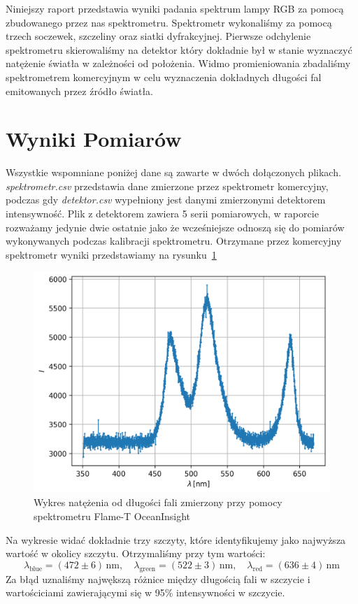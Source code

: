 \documentclass[12pt]{article}
\title{}
\author{Kacper Kłos}
\begin{document}
\maketitle

Niniejszy raport przedstawia wyniki padania spektrum lampy RGB za pomocą zbudowanego przez nas spektrometru. Spektrometr wykonaliśmy za pomocą trzech soczewek, szczeliny oraz siatki dyfrakcyjnej. Pierwsze odchylenie spektrometru skierowaliśmy na detektor który dokładnie był w stanie wyznaczyć natężenie światła w zależności od położenia. Widmo promieniowania zbadaliśmy spektrometrem komercyjnym w celu wyznaczenia dokładnych długości fal emitowanych przez źródło światła.

\newpage
\section{Wyniki Pomiarów}
Wszystkie wspomniane poniżej dane są zawarte w dwóch dołączonych plikach. \textit{spektrometr.csv} przedstawia dane zmierzone przez spektrometr komercyjny, podczas gdy \textit{detektor.csv} wypełniony jest danymi zmierzonymi detektorem intensywność. Plik z detektorem zawiera 5 serii pomiarowych, w raporcie rozważamy jedynie dwie ostatnie jako że wcześniejsze odnoszą się do pomiarów wykonywanych podczas kalibracji spektrometru.
Otrzymane przez komercyjny spektrometr wyniki przedstawiamy na rysunku~\ref{fig:spektrometr}
\begin{figure}[H]
	\centering
	\includegraphics[scale=0.7]{spektrum}
	\caption{Wykres natężenia od długości fali zmierzony przy pomocy spektrometru Flame-T OceanInsight}
	\label{fig:spektrometr}
\end{figure}
Na wykresie widać dokładnie trzy szczyty, które identyfikujemy jako najwyższa wartość w okolicy szczytu. Otrzymaliśmy przy tym wartości:
\[
	\lambda_{\mathrm{blue}} = (472 \pm 6) \, \mathrm{nm}, \quad \lambda_{\mathrm{green}} = (522 \pm 3) \, \mathrm{nm}, \quad \lambda_{\mathrm{red}} = (636 \pm 4) \, \mathrm{nm}
\]
Za błąd uznaliśmy najwększą różnice między długością fali w szczycie i wartościciami zawierającymi się w 95\% intensywności w szczycie.
\end{document}
